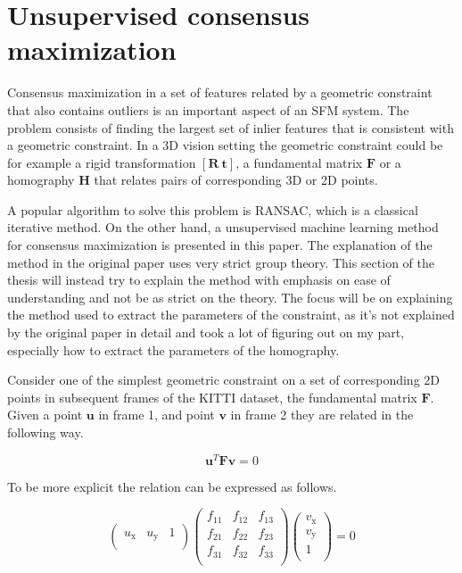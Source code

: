 \section{Unsupervised consensus maximization}

Consensus maximization in a set of features related by a geometric constraint that also contains outliers is an important aspect of an SFM system. The problem consists of finding the largest set of inlier features that is consistent with a geometric constraint. In a 3D vision setting the geometric constraint could be for example a rigid transformation $[\textbf{R}\ \textbf{t}]$, a fundamental matrix $\textbf{F}$ or a homography $\textbf{H}$ that relates pairs of corresponding 3D or 2D points.

A popular algorithm to solve this problem is RANSAC\cite{ransac}, which is a classical iterative method. On the other hand, a unsupervised machine learning method for consensus maximization is presented in this paper\cite{consensus}. The explanation of the method in the original paper uses very strict group theory. This section of the thesis will instead try to explain the method with emphasis on ease of understanding and not be as strict on the theory. The focus will be on explaining the method used to extract the parameters of the constraint, as it's not explained by the original paper in detail and took a lot of figuring out on my part, especially how to extract the parameters of the homography.

Consider one of the simplest geometric constraint on a set of corresponding 2D points in subsequent frames of the KITTI dataset, the fundamental matrix $\textbf{F}$. Given a point $\textbf{u}$ in frame 1, and point $\textbf{v}$ in frame 2 they are related in the following way.

 \begin{equation}
 \textbf{u}^T \textbf{F} \textbf{v} = 0
 \end{equation}
 
 To be more explicit the relation can be expressed as follows.
 
\begin{equation}
\begin{pmatrix}
u_\mathrm{x} & u_\mathrm{y} & 1 \\
\end{pmatrix}
\begin{pmatrix}
f_{11} & f_{12} & f_{13} \\
f_{21} & f_{22} & f_{23} \\
f_{31} & f_{32} & f_{33} \\
\end{pmatrix}
\begin{pmatrix}
v_\mathrm{x} \\
v_\mathrm{y} \\
1 \\
\end{pmatrix}
= 0
\end{equation}

